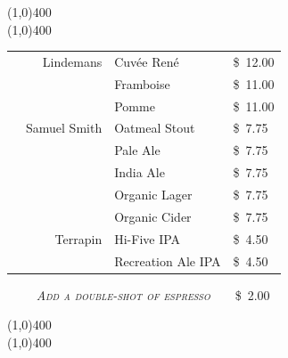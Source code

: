 \documentclass[letterpaper, 12pt]{article}%
\newcommand{\flowtherefore}{~~\raisebox{0.2ex}{$\therefore$}~~}
\newcommand{\price}[2]{
 \textsc{\small#1}\flowtherefore\$~\textsc{\small#2}
}
\newcommand{\varprice}[1]{
 \$~\textsc{\small#1}
}
\newcommand{\heading}[1]{{\large\bfseries #1\par}}
\newcommand{\flowentry}[1]{
{\calligra\centering\heading{\Huge #1}\vspace{-2ex}

\line(1,0){400}\vspace{-3ex}\\
\line(1,0){400}\vspace{-2ex}

}}
\begin{document}
\flowentry{Beer}

\begin{table}[h!]
 \scshape
 \centering
 \begin{tabular}{@{} p{0.25cm} r l l @{}}
  & Lindemans & Cuv\'{e}e Ren\'{e} & \varprice{12.00} \\
  & & Framboise & \varprice{11.00} \\
  & & Pomme & \varprice{11.00} \\
  & Samuel Smith & Oatmeal Stout & \varprice{7.75} \\
  & & Pale Ale & \varprice{7.75} \\
  & & India Ale & \varprice{7.75} \\
  & & Organic Lager & \varprice{7.75} \\
  & & Organic Cider & \varprice{7.75} \\
  & Terrapin & H\textnormal{i}-F\textnormal{i}ve IPA & \varprice{4.50} \\
  & & Recreation Ale IPA & \varprice{4.50} \\
 \end{tabular}
\end{table}

\vspace{-1.0em}
{\centering
 \textbf{\textup{\normalsize{}}}\flowtherefore\price{\textrm{\emph{\normalsize Add a double-shot of espresso}}}{2.00}

}

\flowentry{}

\rule{0pt}{1em}

\newlength{\ssmini}
\setlength{\ssmini}{0.2\textwidth}
\end{document}
